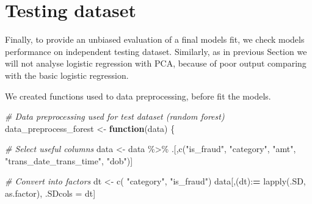 \documentclass[
]{report}
\newenvironment{Shaded}{\begin{snugshade}}{\end{snugshade}}
\newcommand{\CommentTok}[1]{\textcolor[rgb]{0.56,0.35,0.01}{\textit{#1}}}
\newcommand{\ControlFlowTok}[1]{\textcolor[rgb]{0.13,0.29,0.53}{\textbf{#1}}}
\newcommand{\ErrorTok}[1]{\textcolor[rgb]{0.64,0.00,0.00}{\textbf{#1}}}
\newcommand{\FunctionTok}[1]{\textcolor[rgb]{0.00,0.00,0.00}{#1}}
\newcommand{\NormalTok}[1]{#1}
\newcommand{\OtherTok}[1]{\textcolor[rgb]{0.56,0.35,0.01}{#1}}
\newcommand{\SpecialCharTok}[1]{\textcolor[rgb]{0.00,0.00,0.00}{#1}}
\newcommand{\StringTok}[1]{\textcolor[rgb]{0.31,0.60,0.02}{#1}}
\begin{document}
\hypertarget{testing-dataset}{%
\chapter{Testing dataset}\label{testing-dataset}}

Finally, to provide an unbiased evaluation of a final models fit, we
check models performance on independent testing dataset. Similarly, as
in previous Section we will not analyse logistic regression with PCA,
because of poor output comparing with the basic logistic regression.

We created functions used to data preprocessing, before fit the models.

\begin{Shaded}
\begin{Highlighting}[]
\CommentTok{\# Data preprocessing used for test dataset (random forest) }
\NormalTok{data\_preprocess\_forest }\OtherTok{\textless{}{-}} \ControlFlowTok{function}\NormalTok{(data) \{}
  
  \CommentTok{\# Select useful columns}
\NormalTok{  data }\OtherTok{\textless{}{-}}\NormalTok{ data }\SpecialCharTok{\%\textgreater{}\%}
\NormalTok{    .[,}\FunctionTok{c}\NormalTok{(}\StringTok{"is\_fraud"}\NormalTok{, }\StringTok{"category"}\NormalTok{, }\StringTok{"amt"}\NormalTok{, }\StringTok{"trans\_date\_trans\_time"}\NormalTok{, }\StringTok{"dob"}\NormalTok{)]}
  
  \CommentTok{\# Convert into factors}
\NormalTok{  dt }\OtherTok{\textless{}{-}} \FunctionTok{c}\NormalTok{( }\StringTok{"category"}\NormalTok{, }\StringTok{"is\_fraud"}\NormalTok{)}
\NormalTok{  data[,(dt)}\SpecialCharTok{:}\ErrorTok{=} \FunctionTok{lapply}\NormalTok{(.SD, as.factor), .SDcols }\OtherTok{=}\NormalTok{ dt]}
  

\end{Highlighting}
\end{Shaded}
\end{document}
